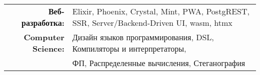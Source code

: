 
\vspace{1em}
\begin{tabular}{rl}

    \textbf{Веб-разработка:} & Elixir, Phoenix, Crystal, Mint, PWA, PostgREST, SSR, Server/Backend-Driven UI, wasm, htmx \\
    \textbf{Computer Science:} & Дизайн языков программирования, DSL, Компиляторы и интерпретаторы,\\
                               & ФП, Распределенные вычисления, Стеганография \\

\end{tabular}
